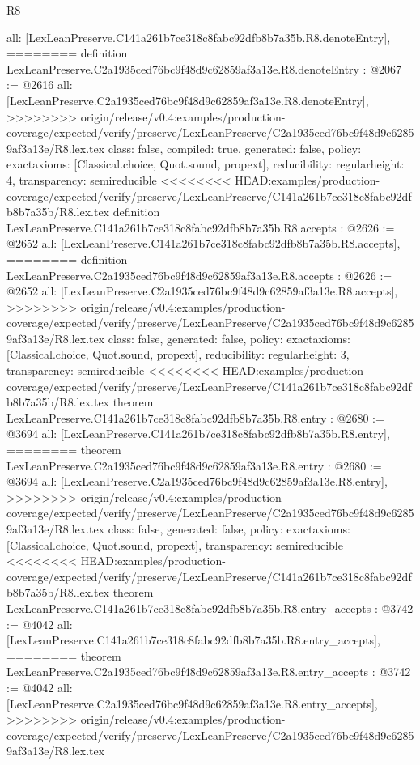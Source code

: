 \begin{lexlean}{R8}
\begin{coremodule}
{{{{{{{{{{{{{{{{{{{{{{{{{{{{{{{{{{{{  all: [LexLeanPreserve.C141a261b7ce318c8fabc92dfb8b7a35b.R8.denoteEntry],
========
definition LexLeanPreserve.C2a1935ced76bc9f48d9c62859af3a13e.R8.denoteEntry : @2067 := @2616 {
  all: [LexLeanPreserve.C2a1935ced76bc9f48d9c62859af3a13e.R8.denoteEntry],
>>>>>>>> origin/release/v0.4:examples/production-coverage/expected/verify/preserve/LexLeanPreserve/C2a1935ced76bc9f48d9c62859af3a13e/R8.lex.tex
  class: false,
  compiled: true,
  generated: false,
  policy: exact{axioms: [Classical.choice, Quot.sound, propext]},
  reducibility: regular{height: 4},
  transparency: semireducible
}
<<<<<<<< HEAD:examples/production-coverage/expected/verify/preserve/LexLeanPreserve/C141a261b7ce318c8fabc92dfb8b7a35b/R8.lex.tex
definition LexLeanPreserve.C141a261b7ce318c8fabc92dfb8b7a35b.R8.accepts : @2626 := @2652 {
  all: [LexLeanPreserve.C141a261b7ce318c8fabc92dfb8b7a35b.R8.accepts],
========
definition LexLeanPreserve.C2a1935ced76bc9f48d9c62859af3a13e.R8.accepts : @2626 := @2652 {
  all: [LexLeanPreserve.C2a1935ced76bc9f48d9c62859af3a13e.R8.accepts],
>>>>>>>> origin/release/v0.4:examples/production-coverage/expected/verify/preserve/LexLeanPreserve/C2a1935ced76bc9f48d9c62859af3a13e/R8.lex.tex
  class: false,
  generated: false,
  policy: exact{axioms: [Classical.choice, Quot.sound, propext]},
  reducibility: regular{height: 3},
  transparency: semireducible
}
<<<<<<<< HEAD:examples/production-coverage/expected/verify/preserve/LexLeanPreserve/C141a261b7ce318c8fabc92dfb8b7a35b/R8.lex.tex
theorem LexLeanPreserve.C141a261b7ce318c8fabc92dfb8b7a35b.R8.entry : @2680 := @3694 {
  all: [LexLeanPreserve.C141a261b7ce318c8fabc92dfb8b7a35b.R8.entry],
========
theorem LexLeanPreserve.C2a1935ced76bc9f48d9c62859af3a13e.R8.entry : @2680 := @3694 {
  all: [LexLeanPreserve.C2a1935ced76bc9f48d9c62859af3a13e.R8.entry],
>>>>>>>> origin/release/v0.4:examples/production-coverage/expected/verify/preserve/LexLeanPreserve/C2a1935ced76bc9f48d9c62859af3a13e/R8.lex.tex
  class: false,
  generated: false,
  policy: exact{axioms: [Classical.choice, Quot.sound, propext]},
  transparency: semireducible
}
<<<<<<<< HEAD:examples/production-coverage/expected/verify/preserve/LexLeanPreserve/C141a261b7ce318c8fabc92dfb8b7a35b/R8.lex.tex
theorem LexLeanPreserve.C141a261b7ce318c8fabc92dfb8b7a35b.R8.entry_accepts : @3742 := @4042 {
  all: [LexLeanPreserve.C141a261b7ce318c8fabc92dfb8b7a35b.R8.entry_accepts],
========
theorem LexLeanPreserve.C2a1935ced76bc9f48d9c62859af3a13e.R8.entry_accepts : @3742 := @4042 {
  all: [LexLeanPreserve.C2a1935ced76bc9f48d9c62859af3a13e.R8.entry_accepts],
>>>>>>>> origin/release/v0.4:examples/production-coverage/expected/verify/preserve/LexLeanPreserve/C2a1935ced76bc9f48d9c62859af3a13e/R8.lex.tex
}}}}}}}}}}}}}}}}}}}}}}}}}}}}}}}}}}}}}}}}
\end{coremodule}
\end{lexlean}
